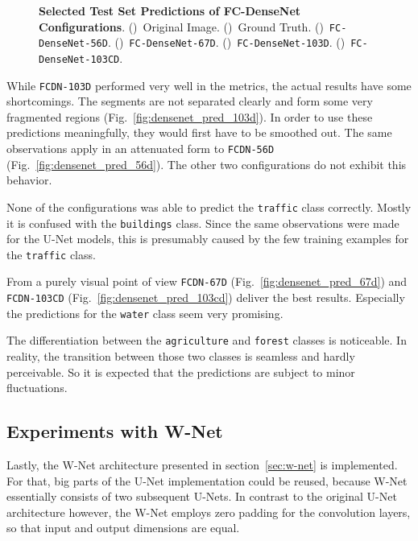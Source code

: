 \begin{figure}[h]
    \caption[Selected Test Set Predictions of FC-DenseNet Configurations]
    {\textbf{Selected Test Set Predictions of FC-DenseNet Configurations}.
    ()~Original Image.
    ()~Ground Truth.
    ()~\texttt{FC-DenseNet-56D}.
    ()~\texttt{FC-DenseNet-67D}.
    ()~\texttt{FC-DenseNet-103D}.
    ()~\texttt{FC-DenseNet-103CD}.}
    \label{fig:densenet_prediction_images}
\end{figure}

While \texttt{FCDN-103D} performed very well in the metrics, the actual results have some shortcomings. The segments are not separated clearly and form some very fragmented regions (Fig.~\ref{fig:densenet_pred_103d}). In order to use these predictions meaningfully, they would first have to be smoothed out. The same observations apply in an attenuated form to \texttt{FCDN-56D} (Fig.~\ref{fig:densenet_pred_56d}). The other two configurations do not exhibit this behavior.

None of the configurations was able to predict the \texttt{traffic} class correctly. Mostly it is confused with the \texttt{buildings} class. Since the same observations were made for the U-Net models, this is presumably caused by the few training examples for the \texttt{traffic} class.

From a purely visual point of view \texttt{FCDN-67D} (Fig.~\ref{fig:densenet_pred_67d}) and \texttt{FCDN-103CD} (Fig.~\ref{fig:densenet_pred_103cd}) deliver the best results. Especially the predictions for the \texttt{water} class seem very promising.

The differentiation between the \texttt{agriculture} and \texttt{forest} classes is noticeable. In reality, the transition between those two classes is seamless and hardly perceivable. So it is expected that the predictions are subject to minor fluctuations.

\subsection{Experiments with W-Net}
\label{sec:wnet_experiments}
Lastly, the W-Net architecture presented in section~\ref{sec:w-net} is implemented. For that, big parts of the U-Net implementation could be reused, because W-Net essentially consists of two subsequent U-Nets. In contrast to the original U-Net architecture however, the W-Net employs zero padding for the convolution layers, so that input and output dimensions are equal.

